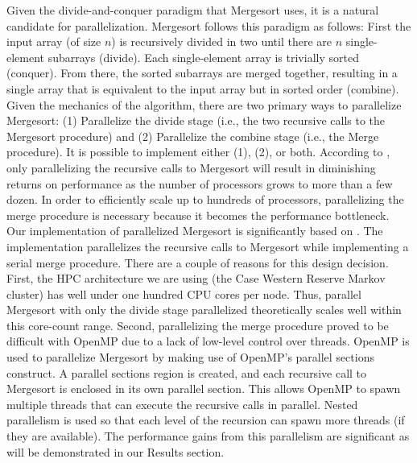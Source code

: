 \documentclass[conference]{IEEEtran}
\begin{document}
	Given the divide-and-conquer paradigm that Mergesort uses, it is a natural candidate for parallelization. Mergesort follows this paradigm as follows: First the input array (of size $n$) is recursively divided in two until there are $n$ single-element subarrays (divide). Each single-element array is trivially sorted (conquer). From there, the sorted subarrays are merged together, resulting in a single array that is equivalent to the input array but in sorted order (combine). Given the mechanics of the algorithm, there are two primary ways to parallelize Mergesort: (1) Parallelize the divide stage (i.e., the two recursive calls to the Mergesort procedure) and (2) Parallelize the combine stage (i.e., the Merge procedure). It is possible to implement either (1), (2), or both. According to \cite{cormen_introduction_2009}, only parallelizing the recursive calls to Mergesort will result in diminishing returns on performance as the number of processors grows to more than a few dozen. In order to efficiently scale up to hundreds of processors, parallelizing the merge procedure is necessary because it becomes the performance bottleneck.
	Our implementation of parallelized Mergesort is significantly based on \cite{radenski_mergesort}. The implementation parallelizes the recursive calls to Mergesort while implementing a serial merge procedure. There are a couple of reasons for this design decision. First, the HPC architecture we are using (the Case Western Reserve Markov cluster) has well under one hundred CPU cores per node. Thus, parallel Mergesort with only the divide stage parallelized theoretically scales well within this core-count range. Second, parallelizing the merge procedure proved to be difficult with OpenMP due to a lack of low-level control over threads. OpenMP is used to parallelize Mergesort by making use of OpenMP's parallel sections construct. A parallel sections region is created, and each recursive call to Mergesort is enclosed in its own parallel section. This allows OpenMP to spawn multiple threads that can execute the recursive calls in parallel. Nested parallelism is used so that each level of the recursion can spawn more threads (if they are available). The performance gains from this parallelism are significant as will be demonstrated in our Results section.
	
	
	
\end{document}
